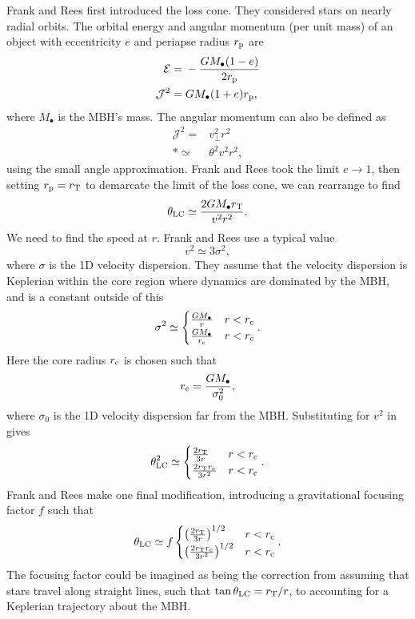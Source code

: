 Frank and Rees first introduced the loss cone. They considered stars on nearly radial orbits. The orbital energy and angular momentum (per unit mass) of an object with eccentricity $e$ and periapse radius $r_\mathrm{p}$ are
\begin{align}
\mathcal{E} = {} & -\frac{GM_\bullet(1 - e)}{2r_\mathrm{p}} \\
\mathcal{J}^2 = {} & GM_\bullet(1 + e)r_\mathrm{p},
\end{align}
where $M_\bullet$ is the MBH's mass. The angular momentum can also be defined as
\begin{align}
\mathcal{J}^2 = {} & v_\perp^2r^2 \nonumber \\*
 \simeq {} & \theta^2v^2r^2,
\end{align}
using the small angle approximation. Frank and Rees took the limit $e \rightarrow 1$, then setting $r_\mathrm{p} = r_\mathrm{T}$ to demarcate the limit of the loss cone, we can rearrange to find
\begin{equation}
\theta_\mathrm{LC} \simeq \frac{2GM_\bullet r_\mathrm{T}}{v^2r^2}.
\label{eq:LC-FR}
\end{equation}
We need to find the speed at $r$. Frank and Rees use a typical value
\begin{equation}
v^2 \simeq 3\sigma^2,
\end{equation}
where $\sigma$ is the 1D velocity dispersion. They assume that the velocity dispersion is Keplerian within the core region where dynamics are dominated by the MBH, and is a constant outside of this
\begin{equation}
\sigma^2 \simeq \begin{cases}
\frac{GM_\bullet}{r} & r < r_\mathrm{c} \\
\frac{GM_\bullet}{r_\mathrm{c}} & r < r_\mathrm{c}
\end{cases}.
\end{equation}
Here the core radius $r_\mathrm{c}$ is chosen such that
\begin{equation}
r_\mathrm{c} = \frac{GM_\bullet}{\sigma_0^2},
\end{equation}
where $\sigma_0$ is the 1D velocity dispersion far from the MBH. Substituting for $v^2$ in  gives
\begin{align}
\theta_\mathrm{LC}^2 \simeq \begin{cases}
\frac{2r_\mathrm{T}}{3r} & r < r_\mathrm{c} \\
\frac{2r_\mathrm{T}r_\mathrm{c}}{3r^2} & r < r_\mathrm{c}
\end{cases}.
\label{eq:FR-LC}
\end{align}
Frank and Rees make one final modification, introducing a gravitational focusing factor $f$ such that
\begin{align}
\theta_\mathrm{LC} \simeq f\begin{cases}
\left(\frac{2r_\mathrm{T}}{3r}\right)^{1/2} & r < r_\mathrm{c} \\
\left(\frac{2r_\mathrm{T}r_\mathrm{c}}{3r^2}\right)^{1/2} & r < r_\mathrm{c}
\end{cases}.
\end{align}
The focusing factor could be imagined as being the correction from assuming that stars travel along straight lines, such that $\tan\theta_\mathrm{LC} = r_\mathrm{T}/r$, to accounting for a Keplerian trajectory about the MBH.

